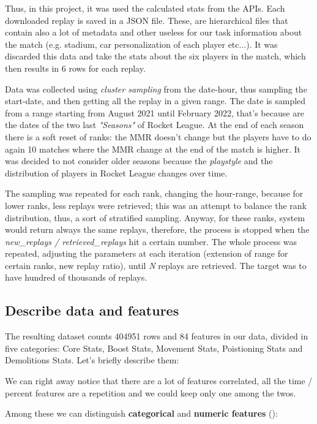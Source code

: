 Thus, in this project, it was used the calculated stats from the APIs. Each downloaded replay is saved in a JSON file. These, are hierarchical files that contain also a lot of metadata and other useless for our task information about the match (e.g. stadium, car personalization of each player etc...). It was discarded this data and take the stats about the six players in the match, which then results in 6 rows for each replay.

Data was collected using \textit{cluster sampling} from the date-hour, thus sampling the start-date, and then getting all the replay in a given range. The date is sampled from a range starting from August 2021 until February 2022, that's because are the dates of the two last \textit{"Seasons"} of Rocket League. At the end of each season there is a soft reset of ranks: the MMR doesn't change but the players have to do again 10 matches where the MMR change at the end of the match is higher.
It was decided to not consider older seasons because the \textit{playstyle} and the distribution of players in Rocket League changes over time.

The sampling was repeated for each rank, changing the hour-range, because for lower ranks, less replays were retrieved; this was an attempt to balance the rank distribution, thus, a sort of stratified sampling.
Anyway, for these ranks, system would return always the same replays, therefore, the process is stopped when the \textit{new\_replays / retrieved\_replays} hit a certain number. The whole process was repeated, adjusting the parameters at each iteration (extension of range for certain ranks, new replay ratio), until \textit{N} replays are retrieved. The target was to have hundred of thousands of replays.

\subsection{Describe data and features}

The resulting dataset counts 404951 rows and 84 features in our data, divided in five categories: Core Stats, Boost Stats, Movement Stats, Poistioning Stats and Demolitions Stats. Let's briefly describe them:



We can right away notice that there are a lot of features correlated, all the time / percent features are a repetition and we could keep only one among the twos.

Among these we can distinguish \textbf{categorical} and \textbf{numeric features} ():

